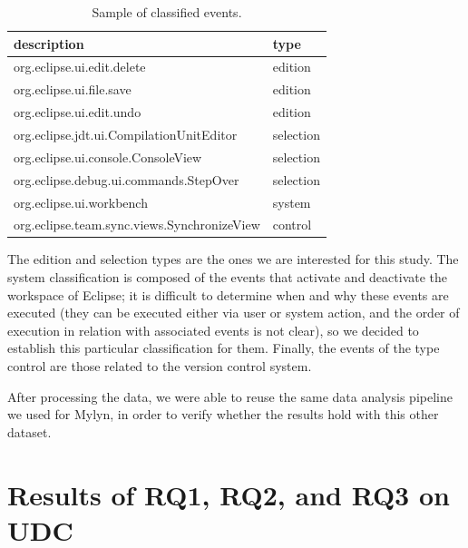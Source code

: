 \documentclass[times]{smrauth}
\begin{document}
\begin{table}[ht!]
\tiny
\renewcommand{\arraystretch}{1.3}
\caption{Sample of classified events. }
\label{tbl:ej_events_udc}
\centering
\begin{tabular}{|p{5.5cm}| p{2 cm} |} 
  \hline 
description & type \\  
  \hline 
    \hline 
org.eclipse.ui.edit.delete & edition \\
org.eclipse.ui.file.save & edition \\
org.eclipse.ui.edit.undo & edition \\
org.eclipse.jdt.ui.CompilationUnitEditor & selection \\
org.eclipse.ui.console.ConsoleView & selection \\
org.eclipse.debug.ui.commands.StepOver & selection \\ 
org.eclipse.ui.workbench & system \\
org.eclipse.team.sync.views.SynchronizeView & control \\
\hline
\end{tabular}
\end{table}

The edition and selection types are the ones we are interested for this study. The system classification is composed of the events that activate and deactivate the workspace of Eclipse; it is difficult to determine when and why these events are executed (they can be executed either via user or system action, and the order of execution in relation with associated events is not clear), so we decided to establish this particular classification for them. Finally, the events of the type control are those related to the version control system. 

After processing the data, we were able to reuse the same data analysis pipeline we used for Mylyn, in order to verify whether the results hold with this other dataset.

\section{Results of RQ1, RQ2, and RQ3 on UDC}
\end{document}
